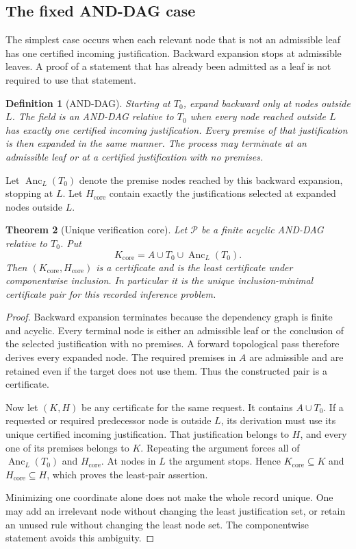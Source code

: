 \documentclass[11pt,oneside]{article}
\theoremstyle{komorebiplain}
\newtheorem{theorem}{Theorem}[section]
\theoremstyle{komorebidefinition}
\newtheorem{definition}[theorem]{Definition}
\theoremstyle{komorebiremark}
\newcommand{\Pcal}{\mathcal P}
\newcommand{\Anc}{\operatorname{Anc}}
\begin{document}
\subsection{The fixed AND-DAG case}

The simplest case occurs when each relevant node that is not an admissible leaf has one certified incoming justification. Backward expansion stops at admissible leaves. A proof of a statement that has already been admitted as a leaf is not required to use that statement.

\begin{definition}[AND-DAG]
\label{res:4:2}
Starting at $T_0$, expand backward only at nodes outside $L$. The field is an AND-DAG relative to $T_0$ when every node reached outside $L$ has exactly one certified incoming justification. Every premise of that justification is then expanded in the same manner. The process may terminate at an admissible leaf or at a certified justification with no premises.
\end{definition}

Let $\Anc_L(T_0)$ denote the premise nodes reached by this backward expansion, stopping at $L$. Let $H_{\mathrm{core}}$ contain exactly the justifications selected at expanded nodes outside $L$.

\begin{theorem}[Unique verification core]
\label{res:4:3}
\label{thm:and-core}
Let $\Pcal$ be a finite acyclic AND-DAG relative to $T_0$. Put
\[
K_{\mathrm{core}}=A\cup T_0\cup\Anc_L(T_0).
\]
Then $(K_{\mathrm{core}},H_{\mathrm{core}})$ is a certificate and is the least certificate under componentwise inclusion. In particular it is the unique inclusion-minimal certificate pair for this recorded inference problem.
\end{theorem}

\begin{proof}
Backward expansion terminates because the dependency graph is finite and acyclic. Every terminal node is either an admissible leaf or the conclusion of the selected justification with no premises. A forward topological pass therefore derives every expanded node. The required premises in $A$ are admissible and are retained even if the target does not use them. Thus the constructed pair is a certificate.

Now let $(K,H)$ be any certificate for the same request. It contains $A\cup T_0$. If a requested or required predecessor node is outside $L$, its derivation must use its unique certified incoming justification. That justification belongs to $H$, and every one of its premises belongs to $K$. Repeating the argument forces all of $\Anc_L(T_0)$ and $H_{\mathrm{core}}$. At nodes in $L$ the argument stops. Hence $K_{\mathrm{core}}\subseteq K$ and $H_{\mathrm{core}}\subseteq H$, which proves the least-pair assertion.

Minimizing one coordinate alone does not make the whole record unique. One may add an irrelevant node without changing the least justification set, or retain an unused rule without changing the least node set. The componentwise statement avoids this ambiguity.
\end{proof}
\end{document}
